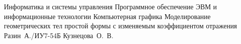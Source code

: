 \documentclass{bmstu}[a4paper]
\begin{document}
	\makecourseworktitle
	{Информатика и системы управления} %
	{Программное обеспечение ЭВМ и информационные технологии} %
	{} %
	{Компьютерная графика} %
	{Моделирование геометрических тел простой формы с изменяемым коэффициентом отражения} %
	{} %
	{Разин~А./ИУ7-54Б} %
	{Кузнецова~О.~В.} %
	
	
	\maketableofcontents

	
	
	
	
	
	


	\makebibliography

	
\end{document}
